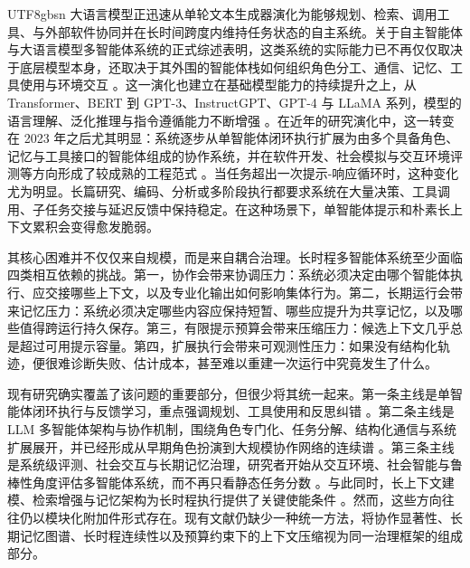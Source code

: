 \documentclass[a4paper,fleqn]{cas-sc}
\begin{document}
\begin{CJK*}{UTF8}{gbsn}
大语言模型正迅速从单轮文本生成器演化为能够规划、检索、调用工具、与外部软件协同并在长时间跨度内维持任务状态的自主系统。关于自主智能体与大语言模型多智能体系统的正式综述表明，这类系统的实际能力已不再仅仅取决于底层模型本身，还取决于其外围的智能体栈如何组织角色分工、通信、记忆、工具使用与环境交互 \citep{wang2024survey,guo2024llmmas,li2024masworkflow}。这一演化也建立在基础模型能力的持续提升之上，从 Transformer、BERT 到 GPT-3、InstructGPT、GPT-4 与 LLaMA 系列，模型的语言理解、泛化推理与指令遵循能力不断增强 \citep{vaswani2017attention,devlin2019bert,brown2020gpt3,ouyang2022instructgpt,openai2023gpt4,touvron2023llama,touvron2023llama2}。在近年的研究演化中，这一转变在 2023 年之后尤其明显：系统逐步从单智能体闭环执行扩展为由多个具备角色、记忆与工具接口的智能体组成的协作系统，并在软件开发、社会模拟与交互环境评测等方向形成了较成熟的工程范式 \citep{hong2024metagpt,qian2024chatdev,liu2024agentbench,zhou2024sotopia}。当任务超出一次提示-响应循环时，这种变化尤为明显。长篇研究、编码、分析或多阶段执行都要求系统在大量决策、工具调用、子任务交接与延迟反馈中保持稳定。在这种场景下，单智能体提示和朴素长上下文累积会变得愈发脆弱。

其核心困难并不仅仅来自规模，而是来自耦合治理。长时程多智能体系统至少面临四类相互依赖的挑战。第一，协作会带来协调压力：系统必须决定由哪个智能体执行、应交接哪些上下文，以及专业化输出如何影响集体行为。第二，长期运行会带来记忆压力：系统必须决定哪些内容应保持短暂、哪些应提升为共享记忆，以及哪些值得跨运行持久保存。第三，有限提示预算会带来压缩压力：候选上下文几乎总是超过可用提示容量。第四，扩展执行会带来可观测性压力：如果没有结构化轨迹，便很难诊断失败、估计成本，甚至难以重建一次运行中究竟发生了什么。

现有研究确实覆盖了该问题的重要部分，但很少将其统一起来。第一条主线是单智能体闭环执行与反馈学习，重点强调规划、工具使用和反思纠错 \citep{wang2024survey,yao2023react,shinn2023reflexion}。第二条主线是 LLM 多智能体架构与协作机制，围绕角色专门化、任务分解、结构化通信与系统扩展展开，并已经形成从早期角色扮演到大规模协作网络的连续谱 \citep{guo2024llmmas,li2024masworkflow,li2023camel,wu2023autogen,hong2024metagpt,qian2024chatdev,gan2025master,wang2025megaagent,qian2025macnet,du2025crossteam}。第三条主线是系统级评测、社会交互与长期记忆治理，研究者开始从交互环境、社会智能与鲁棒性角度评估多智能体系统，而不再只看静态任务分数 \citep{liu2024agentbench,chan2024chateval,zhou2024sotopia,wang2024sotopiapi,dong2026pear}。与此同时，长上下文建模、检索增强与记忆架构为长时程执行提供了关键使能条件 \citep{li2024sbarope,lewis2020rag,park2023generative}。然而，这些方向往往仍以模块化附加件形式存在。现有文献仍缺少一种统一方法，将协作显著性、长期记忆图谱、长时程连续性以及预算约束下的上下文压缩视为同一治理框架的组成部分。


\end{CJK*}
\end{document}
